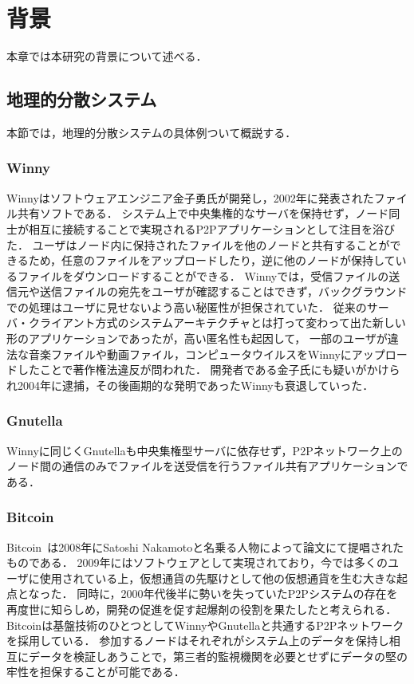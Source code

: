 \chapter{背景}
\label{background}

本章では本研究の背景について述べる．

\section{地理的分散システム}
\label{background:geographically-disdtributed-system}
本節では，地理的分散システムの具体例ついて概説する．

\subsection{Winny}
Winnyはソフトウェアエンジニア金子勇氏が開発し，2002年に発表されたファイル共有ソフトである．
システム上で中央集権的なサーバを保持せず，ノード同士が相互に接続することで実現されるP2Pアプリケーションとして注目を浴びた．
ユーザはノード内に保持されたファイルを他のノードと共有することができるため，任意のファイルをアップロードしたり，逆に他のノードが保持しているファイルをダウンロードすることができる．
Winnyでは，受信ファイルの送信元や送信ファイルの宛先をユーザが確認することはできず，バックグラウンドでの処理はユーザに見せないよう高い秘匿性が担保されていた．
従来のサーバ・クライアント方式のシステムアーキテクチャとは打って変わって出た新しい形のアプリケーションであったが，高い匿名性も起因して，
一部のユーザが違法な音楽ファイルや動画ファイル，コンピュータウイルスをWinnyにアップロードしたことで著作権法違反が問われた．
開発者である金子氏にも疑いがかけられ2004年に逮捕，その後画期的な発明であったWinnyも衰退していった．

\subsection{Gnutella}
Winnyに同じくGnutellaも中央集権型サーバに依存せず，P2Pネットワーク上のノード間の通信のみでファイルを送受信を行うファイル共有アプリケーションである．

\subsection{Bitcoin}
Bitcoin~\cite{Bitcoin}は2008年にSatoshi Nakamotoと名乗る人物によって論文にて提唱されたものである．
2009年にはソフトウェアとして実現されており，今では多くのユーザに使用されている上，仮想通貨の先駆けとして他の仮想通貨を生む大きな起点となった．
同時に，2000年代後半に勢いを失っていたP2Pシステムの存在を再度世に知らしめ，開発の促進を促す起爆剤の役割を果たしたと考えられる．
Bitcoinは基盤技術のひとつとしてWinnyやGnutellaと共通するP2Pネットワークを採用している．
参加するノードはそれぞれがシステム上のデータを保持し相互にデータを検証しあうことで，第三者的監視機関を必要とせずにデータの堅の牢性を担保することが可能である．

